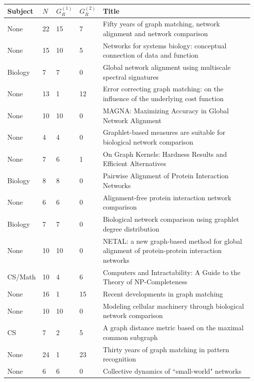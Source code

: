 \documentclass[12pt]{thesis}
\theoremstyle{plain}
\theoremstyle{definition}
\theoremstyle{remark}
\begin{document}
{\begin{singlespace}
\begin{longtable}{|L{0.095\textwidth}|C{0.04\textwidth}|C{0.045\textwidth}|C{0.045\textwidth}|L{0.7\textwidth}|}
\hline
Subject & $N$ & $G_R^{(1)}$ & $G_R^{(2)}$ & Title \\ \hline
\hline
\endhead
None & 22 & 15 & 7 & Fifty years of graph matching, network alignment and network comparison \\ \hline
None & 15 & 10 & 5 & Networks for systems biology: conceptual connection of data and function \\ \hline
Biology & 7 & 7 & 0 & Global network alignment using multiscale spectral signatures \\ \hline
None & 13 & 1 & 12 & Error correcting graph matching: on the influence of the underlying cost function \\ \hline
None & 10 & 10 & 0 & MAGNA: Maximizing Accuracy in Global Network Alignment \\ \hline
None & 4 & 4 & 0 & Graphlet-based measures are suitable for biological network comparison \\ \hline
None & 7 & 6 & 1 & On Graph Kernels: Hardness Results and Efficient Alternatives \\ \hline
Biology & 8 & 8 & 0 & Pairwise Alignment of Protein Interaction Networks \\ \hline
None & 6 & 6 & 0 & Alignment-free protein interaction network comparison \\ \hline
Biology & 7 & 7 & 0 & Biological network comparison using graphlet degree distribution \\ \hline
None & 10 & 10 & 0 & NETAL: a new graph-based method for global alignment of protein-protein interaction networks \\ \hline
CS/Math & 10 & 4 & 6 & Computers and Intractability: A Guide to the Theory of NP-Completeness \\ \hline
None & 16 & 1 & 15 & Recent developments in graph matching \\ \hline
None & 10 & 10 & 0 & Modeling cellular machinery through biological network comparison \\ \hline
CS & 7 & 2 & 5 & A graph distance metric based on the maximal common subgraph \\ \hline
None & 24 & 1 & 23 & Thirty years of graph matching in pattern recognition \\ \hline
None & 6 & 6 & 0 & Collective dynamics of ``small-world" networks \\ \hline

\end{longtable}
\end{singlespace}}
\end{document}
